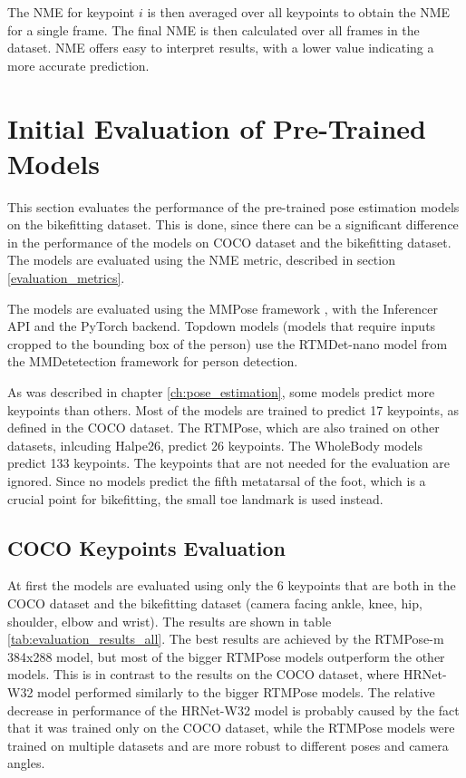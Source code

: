 The NME for keypoint $i$ is then averaged over all keypoints to obtain the NME for a single frame. The final NME is then calculated over all frames in the dataset. NME offers easy to interpret results, with a lower value indicating a more accurate prediction.

\section{Initial Evaluation of Pre-Trained Models}
\label{initial_evaluation}
This section evaluates the performance of the pre-trained pose estimation models on the bikefitting dataset. This is done, since there can be a significant difference in the performance of the models on COCO dataset and the bikefitting dataset. The models are evaluated using the NME metric, described in section \ref{evaluation_metrics}.

The models are evaluated using the MMPose framework \cite{mmpose2020}, with the Inferencer API and the PyTorch backend. Topdown models (models that require inputs cropped to the bounding box of the person) use the RTMDet-nano model \cite{rtmdet} from the MMDetetection framework \cite{mmdetection} for person detection.

As was described in chapter \ref{ch:pose_estimation}, some models predict more keypoints than others. Most of the models are trained to predict 17 keypoints, as defined in the COCO dataset. The RTMPose, which are also trained on other datasets, inlcuding Halpe26, predict 26 keypoints. The WholeBody models predict 133 keypoints. The keypoints that are not needed for the evaluation are ignored. Since no models predict the fifth metatarsal of the foot, which is a crucial point for bikefitting, the small toe landmark is used instead.

\subsection{COCO Keypoints Evaluation}

At first the models are evaluated using only the 6 keypoints that are both in the COCO dataset and the bikefitting dataset (camera facing ankle, knee, hip, shoulder, elbow and wrist). The results are shown in table \ref{tab:evaluation_results_all}. The best results are achieved by the RTMPose-m 384x288 model, but most of the bigger RTMPose models outperform the other models. This is in contrast to the results on the COCO dataset, where HRNet-W32 model performed similarly to the bigger RTMPose models. The relative decrease in performance of the HRNet-W32 model is probably caused by the fact that it was trained only on the COCO dataset, while the RTMPose models were trained on multiple datasets and are more robust to different poses and camera angles.




